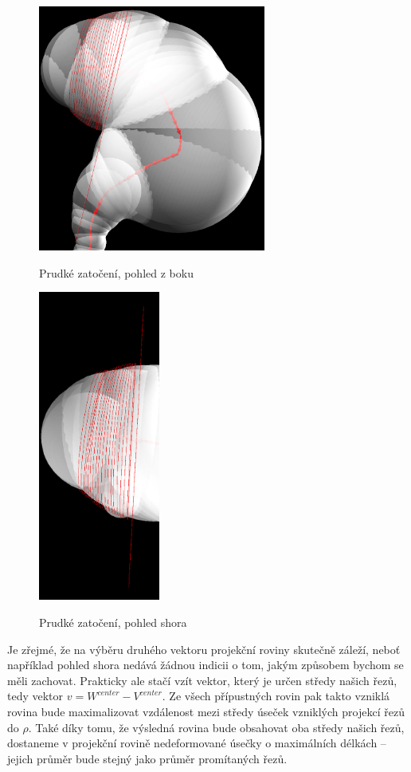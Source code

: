 \begin{figure}[ht]
\begin{minipage}{.6\textwidth}
  \centering
        \includegraphics[width=75mm]{img/sharp_curve_lookahead.png}
        \caption{Prudké zatočení, pohled z boku}
    \centering
    \label{fig:sharp_curve_lookahead}
\end{minipage}%
\begin{minipage}{.4\textwidth}
    \centering
        \includegraphics[width=40mm]{img/sharp_curve_lookahead_up.png}
        \caption{Prudké zatočení, pohled shora}
    \centering
    \label{fig:sharp_curve_lookahead_from_up}
\end{minipage}
\end{figure}

Je zřejmé, že na výběru druhého vektoru projekční roviny skutečně záleží, neboť
například pohled shora nedává žádnou indicii o tom, jakým způsobem bychom
se měli zachovat. Prakticky ale stačí vzít vektor, který je
určen středy našich řezů, tedy vektor $ {v = W^{center} - V^{center} }$. Ze všech
přípustných rovin pak takto vzniklá rovina bude maximalizovat vzdálenost mezi
středy úseček vzniklých projekcí řezů do $ \rho $. Také díky tomu, že
výsledná rovina bude obsahovat oba středy našich řezů, dostaneme v projekční
rovině nedeformované úsečky o maximálních délkách – jejich průměr bude stejný
jako průměr promítaných řezů.

